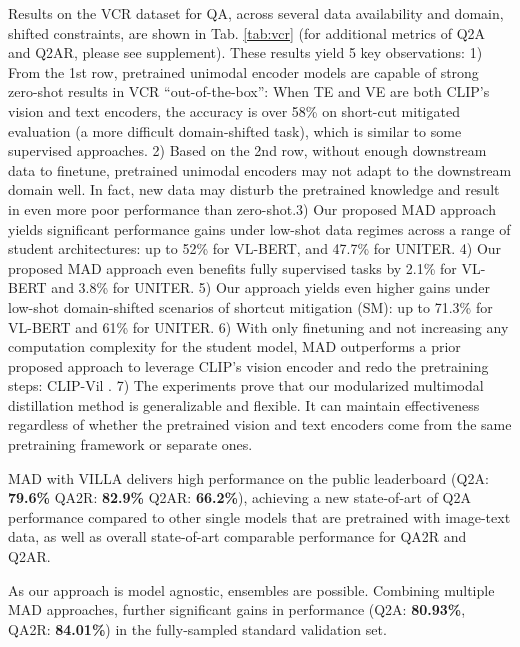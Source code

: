 \documentclass[runningheads]{llncs}
\begin{document}
Results on the VCR dataset for QA, across several data availability and domain, shifted constraints, are shown in Tab. \ref{tab:vcr}  (for additional metrics of Q2A and Q2AR, please see supplement). These results yield 5 key observations: 1) From the 1st row, pretrained unimodal encoder models are capable of strong zero-shot results in VCR ``out-of-the-box'': When TE and VE are both CLIP's vision and text encoders, the accuracy is over 58\% on short-cut mitigated evaluation (a more difficult domain-shifted task), which is similar to some supervised approaches. 2) Based on the 2nd row, without enough downstream data to finetune, pretrained unimodal encoders may not adapt to the downstream domain well. In fact, new data may disturb the pretrained knowledge and result in even more poor performance than zero-shot.3) Our proposed MAD approach yields significant performance gains under low-shot data regimes across a range of student architectures: up to 52\% for VL-BERT, and 47.7\% for UNITER. 4) Our proposed MAD approach even benefits fully supervised tasks by 2.1\% for VL-BERT and 3.8\% for UNITER. 5) Our approach yields even higher gains under low-shot domain-shifted scenarios of shortcut mitigation (SM): up to 71.3\% for VL-BERT and 61\% for UNITER. 6) With only finetuning and not increasing any computation complexity for the student model, MAD outperforms a prior proposed approach to leverage CLIP's vision encoder and redo the pretraining steps: CLIP-Vil \cite{shengshen}. 7) The experiments prove that our modularized multimodal distillation method is generalizable and flexible. It can maintain effectiveness regardless of whether the pretrained vision and text encoders come from the same pretraining framework or separate ones.





MAD with VILLA delivers high performance on the public leaderboard (Q2A: \textbf{79.6\%} QA2R: \textbf{82.9\%} Q2AR: \textbf{66.2\%}), achieving a new state-of-art of Q2A performance compared to other single models that are pretrained with image-text data, as well as overall state-of-art comparable performance for QA2R and Q2AR.

As our approach is model agnostic, ensembles are possible. Combining multiple MAD approaches, further significant gains in performance (Q2A: \textbf{80.93\%}, QA2R: \textbf{84.01\%}) in the fully-sampled standard validation set.
\end{document}
